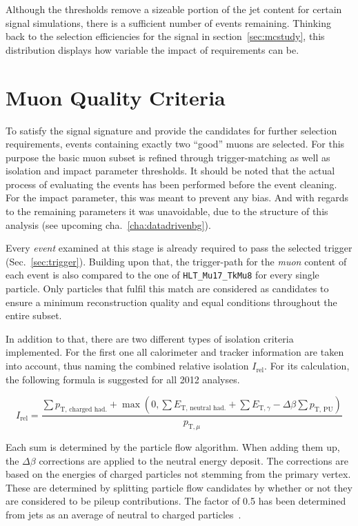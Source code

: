 \noindent Although the thresholds remove a sizeable portion of the jet content for certain signal simulations, there is a sufficient number of events remaining. Thinking back to the selection efficiencies for the signal in section~\ref{sec:mcstudy}, this distribution displays how variable the impact of requirements can be.
 

\section{Muon Quality Criteria}
\label{sec:muonqualy}

To satisfy the signal signature and provide the candidates for further selection requirements, events containing exactly two ``good'' muons are selected. For this purpose the basic muon subset is refined through trigger-matching as well as isolation and impact parameter thresholds. It should be noted that the actual process of evaluating the events has been performed before the event cleaning. For the impact parameter, this was meant to prevent any bias. And with regards to the remaining parameters it was unavoidable, due to the structure of this analysis (see upcoming cha.~\ref{cha:datadrivenbg}).

Every \textit{event} examined at this stage is already required to pass the selected trigger (Sec.~\ref{sec:trigger}). Building upon that, the trigger-path for the \textit{muon} content of each event is also compared to the one of \verb+HLT_Mu17_TkMu8+ for every single particle. Only particles that fulfil this match are considered as candidates to ensure a minimum reconstruction quality and equal conditions throughout the entire subset. 

In addition to that, there are two different types of isolation criteria implemented. For the first one all calorimeter and tracker information are taken into account, thus naming the combined relative isolation $I_{\text{rel}}$. For its calculation, the following formula is suggested for all 2012 analyses.

\begin{equation}
  \label{eq:reliso}
  I_{\text{rel}} = \frac{ \sum p_{\text{T, charged had.}} + \max \left( 0,  \sum E_{\text{T, neutral had.}} + \sum E_{\text{T}, \gamma} - \Delta\beta \sum p_{\text{T, PU}} \right) }{ p_{\text{T}, \mu} }
\end{equation}

Each sum is determined by the particle flow algorithm. When adding them up, the $\Delta \beta$ corrections are applied to the neutral energy deposit. The corrections are based on the energies of charged particles not stemming from the primary vertex. These are determined by splitting particle flow candidates by whether or not they are considered to be pileup contributions. The factor of 0.5 has been determined from jets as an average of neutral to charged particles~\cite{muondbeta}.

